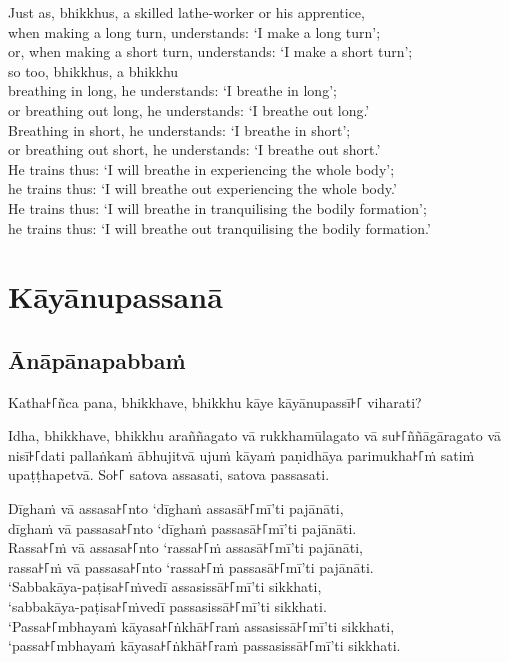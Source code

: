 Just as, bhikkhus, a skilled lathe-worker or his apprentice,\\
when making a long turn, understands: ‘I make a long turn’;\\
or, when making a short turn, understands: ‘I make a short turn’;\\
so too, bhikkhus, a bhikkhu\\
breathing in long, he understands: ‘I breathe in long’;\\
or breathing out long, he understands: ‘I breathe out long.’\\
Breathing in short, he understands: ‘I breathe in short’;\\
or breathing out short, he understands: ‘I breathe out short.’\\
He trains thus: ‘I will breathe in experiencing the whole body’;\\
he trains thus: ‘I will breathe out experiencing the whole body.’\\
He trains thus: ‘I will breathe in tranquilising the bodily formation’;\\
he trains thus: ‘I will breathe out tranquilising the bodily formation.’

\paliPage
\chapter*{Kāyānupassanā}

\section*{Ānāpānapabbaṁ}

Katha꜔꜒ñca pana, bhikkhave, bhikkhu kāye kāyānupassī꜔꜒ viharati?

Idha, bhikkhave, bhikkhu araññagato vā rukkhamūlagato vā su꜔꜒ññāgāragato vā
nisī꜔꜒dati pallaṅkaṁ ābhujitvā ujuṁ kāyaṁ paṇidhāya parimukha꜔꜒ṁ satiṁ upaṭṭhapetvā.
So꜔꜒ satova assasati, satova passasati.

Dīghaṁ vā assasa꜔꜒nto ‘dīghaṁ assasā꜔꜒mī’ti pajānāti,\\
dīghaṁ vā passasa꜔꜒nto ‘dīghaṁ passasā꜔꜒mī’ti pajānāti.\\
Rassa꜔꜒ṁ vā assasa꜔꜒nto ‘rassa꜔꜒ṁ assasā꜔꜒mī’ti pajānāti,\\
rassa꜔꜒ṁ vā passasa꜔꜒nto ‘rassa꜔꜒ṁ passasā꜔꜒mī’ti pajānāti.\\
‘Sabbakāya-paṭisa꜔꜒ṁvedī assasissā꜔꜒mī’ti sikkhati,\\
‘sabbakāya-paṭisa꜔꜒ṁvedī passasissā꜔꜒mī’ti sikkhati.\\
‘Passa꜔꜒mbhayaṁ kāyasa꜔꜒ṅkhā꜔꜒raṁ assasissā꜔꜒mī’ti sikkhati,\\
‘passa꜔꜒mbhayaṁ kāyasa꜔꜒ṅkhā꜔꜒raṁ passasissā꜔꜒mī’ti sikkhati.

